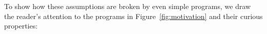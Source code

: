 \documentclass[preprint]{sigplanconf}
\theoremstyle{definition}
\begin{document}
To show how these assumptions are broken by even simple programs, we draw the reader's attention to the programs in
Figure~\ref{fig:motivation} and their curious properties:



\end{document}
